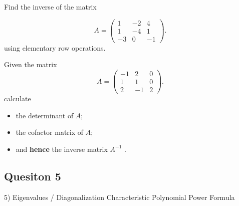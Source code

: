 \documentclass[12pt,a4paper]{article}
\begin{document}
 Find the inverse of the  matrix 

\begin{equation*}
A=\left( \begin{array}{rrr}
1 & -2 & 4\\
1 & -4 & 1\\
-3 & 0 & -1
\end{array} \right).
\end{equation*}
using elementary row operations.

 Given the  matrix 
\begin{equation*}
A=\left( \begin{array}{rrr}
-1 & 2 & 0\\
1 & 1 & 0\\
2 & -1 & 2
\end{array} \right).
\end{equation*}
calculate
\begin{itemize}
\item the determinant of $A$;
\item the cofactor matrix of $A$;
\item and {\bf hence} the inverse matrix $A^{-1}$ .
\end{itemize}
\subsection*{Quesiton 5}
5) Eigenvalues / Diagonalization
	Characteristic Polynomial
	Power Formula
	
\end{document}

